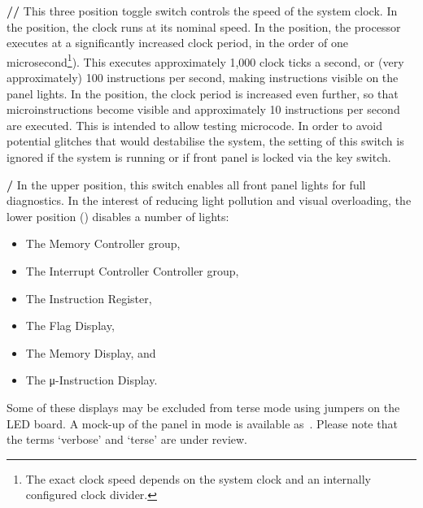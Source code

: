 \begin{description}
\item{\bfseries{}//} This three position toggle
  switch controls the speed of the system clock. In the 
  position, the clock runs at its nominal speed. In the 
  position, the processor executes at a significantly increased clock
  period, in the order of one microsecond\footnote{The exact clock
    speed depends on the system clock and an internally configured
    clock divider.}). This executes approximately 1,000 clock ticks a
  second, or (very approximately) 100 instructions per second, making
  instructions visible on the panel lights. In the  position,
  the clock period is increased even further, so that
  microinstructions become visible and approximately 10 instructions
  per second are executed. This is intended to allow testing
  microcode. In order to avoid potential glitches that would
  destabilise the system, the setting of this switch is ignored if the
  system is running or if front panel is locked via the key switch.

\item{\bfseries{}/} In the upper position, this switch
  enables all front panel lights for full diagnostics. In the interest
  of reducing light pollution and visual overloading, the lower
  position () disables a number of lights:
\begin{itemize}
\item The Memory Controller group,
\item The Interrupt Controller Controller group,
\item The Instruction Register,
\item The Flag Display,
\item The Memory Display, and
\item The μ-Instruction Display.
\end{itemize}

Some of these displays may be excluded from terse mode using jumpers
on the LED board. A mock-up of the panel in  mode is
available as~. Please note that the terms
‘verbose’ and ‘terse’ are under review.


\end{description}
